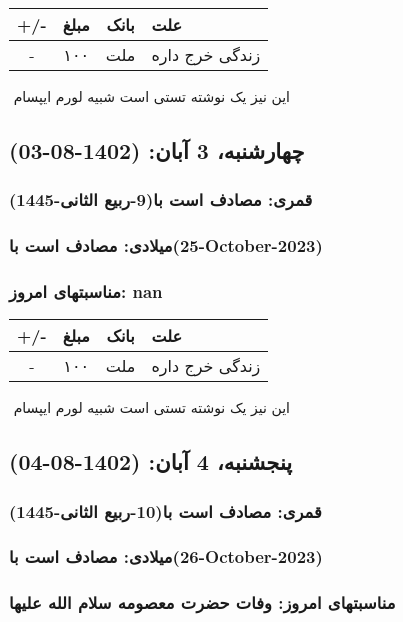 \documentclass{article}
\newcommand{\rnote}[1]{\marginpar{\textcolor{color}{\StrSubstitute{\##1}{ }{\_}}}}
\newcommand{\myRow}[4]{
    #1 & #2 & #3 & #4 \\ \hline
}
\begin{document}
\begin{tabular}{ | c | c | c | p{5cm} |}
    \hline
    \myRow{ +/- }{مبلغ}{بانک}{علت}
    \myRow{-}{۱۰۰}{ملت}{زندگی خرج داره}
\end{tabular}
\newline
\newline

‌
\rnote{تست}
این نیز یک نوشته تستی است شبیه لورم ایپسام




\newpage
{}
\textcolor{color}{
\section{ چهارشنبه، 3 آبان: (1402-08-03) }
\subsubsection*{قمری: مصادف است با(9-ربیع الثانی-1445)} 
\subsubsection*{میلادی: مصادف است با(25-October-2023)}
\subsubsection*{مناسبتهای امروز: nan}
}


\begin{tabular}{ | c | c | c | p{5cm} |}
    \hline
    \myRow{ +/- }{مبلغ}{بانک}{علت}
    \myRow{-}{۱۰۰}{ملت}{زندگی خرج داره}
\end{tabular}
\newline
\newline

‌
\rnote{تست}
این نیز یک نوشته تستی است شبیه لورم ایپسام




\newpage
{}
\textcolor{color}{
\section{ پنجشنبه، 4 آبان: (1402-08-04) }
\subsubsection*{قمری: مصادف است با(10-ربیع الثانی-1445)} 
\subsubsection*{میلادی: مصادف است با(26-October-2023)}
\subsubsection*{مناسبتهای امروز: وفات حضرت معصومه سلام الله علیها}
}
\end{document}
